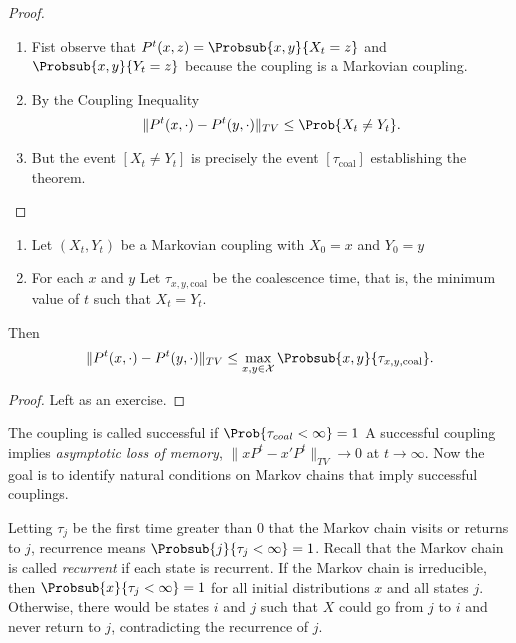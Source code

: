 \documentclass[12pt]{article}
\begin{document}
\begin{proof}
    \begin{enumerate}
        \item
            Fist observe that \( P^t(x,z) = \Probsub{x,y}{X_t = z} \)
            and \( \Probsub {x,y}{Y_t = z} \) because the coupling is a
            Markovian coupling.
        \item
            By the Coupling Inequality
            \[
                \| P^t(x,\cdot) - P^t(y,\cdot)\|_{TV} \le \Prob{X_t \ne
                Y_t}.
            \]
        \item
            But the event \( [X_t \ne Y_t] \) is precisely the event \(
            [\tau_ {\text{coal}}] \) establishing the theorem.
    \end{enumerate}
\end{proof}

\begin{corollary}
    \begin{enumerate}
        \item
            Let \( (X_t, Y_t) \) be a Markovian coupling with \( X_0 = x
            \) and \( Y_0 = y \)
        \item
            For each \( x \) and \( y \) Let \( \tau_{x,y,\text{coal}} \)
            be the coalescence time, that is, the minimum value of \( t \)
            such that \( X_t = Y_t \).
    \end{enumerate}
    Then
    \[
        \| P^t(x,\cdot) - P^t(y,\cdot)\|_{TV} \le \max_{x,y \in \mathcal
          {X}} \Probsub{x,y}{\tau_{x,y,\text{coal}}}.
    \]    
    \end{corollary}

    \begin{proof}
        Left as an exercise.
    \end{proof}

    The coupling is called successful if \( \Prob{\tau_{coal} < \infty} =
    1 \) A successful coupling implies \emph{asymptotic loss of memory},
    \( \| x P^t - x' P^t \|_{TV} \to 0 \) at \( t \to \infty \).  Now
    the goal is to identify natural conditions on Markov chains that
    imply successful couplings.

    Letting \( \tau_j \) be the first time greater than \( 0 \) that the
    Markov chain visits or returns to \( j \), recurrence means \(
    \Probsub{j}{\tau_j < \infty} = 1 \).  Recall that the Markov chain
    is called \emph{recurrent} if each state is recurrent.%
    If the Markov chain is irreducible, then \( \Probsub{x}{\tau_j <
    \infty} = 1 \) for all initial distributions \( x \) and all states \(
    j \).  Otherwise, there would be states \( i \) and \( j \) such
    that \( X \) could go from \( j \) to \( i \) and never return to \(
    j \), contradicting the recurrence of \( j \).
\end{document}
